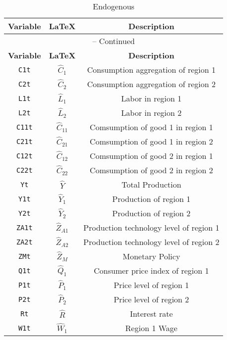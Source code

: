 \begin{center}
\begin{longtable}{ccc}
\caption{Endogenous}\\%
\hline%
\multicolumn{1}{c}{\textbf{Variable}} &
\multicolumn{1}{c}{\textbf{\LaTeX}} &
\multicolumn{1}{c}{\textbf{Description}}\\%
\hline\hline%
\endfirsthead
\multicolumn{3}{c}{{\tablename} \thetable{} -- Continued}\\%
\hline%
\multicolumn{1}{c}{\textbf{Variable}} &
\multicolumn{1}{c}{\textbf{\LaTeX}} &
\multicolumn{1}{c}{\textbf{Description}}\\%
\hline\hline%
\endhead
\texttt{C1t} & ${\hat{C}_{1}}$ & Consumption aggregation of region 1\\
\texttt{C2t} & ${\hat{C}_{2}}$ & Consumption aggregation of region 2\\
\texttt{L1t} & ${\hat{L}_{1}}$ & Labor in region 1\\
\texttt{L2t} & ${\hat{L}_{2}}$ & Labor in region 2\\
\texttt{C11t} & ${\hat{C}_{11}}$ & Comsumption of good 1 in region 1\\
\texttt{C21t} & ${\hat{C}_{21}}$ & Comsumption of good 1 in region 2\\
\texttt{C12t} & ${\hat{C}_{12}}$ & Comsumption of good 2 in region 1\\
\texttt{C22t} & ${\hat{C}_{22}}$ & Comsumption of good 2 in region 2\\
\texttt{Yt} & ${\hat{Y}}$ & Total Production\\
\texttt{Y1t} & ${\hat{Y}_{1}}$ & Production of region 1\\
\texttt{Y2t} & ${\hat{Y}_{2}}$ & Production of region 2\\
\texttt{ZA1t} & ${\hat{Z}_{A1}}$ & Production technology level of region 1\\
\texttt{ZA2t} & ${\hat{Z}_{A2}}$ & Production technology level of region 2\\
\texttt{ZMt} & ${\hat{Z}_M}$ & Monetary Policy\\
\texttt{Q1t} & ${\hat{Q}_{1}}$ & Consumer price index of region 1\\
\texttt{P1t} & ${\hat{P}_{1}}$ & Price level of region 1\\
\texttt{P2t} & ${\hat{P}_{2}}$ & Price level of region 2\\
\texttt{Rt} & ${\hat{R}}$ & Interest rate\\
\texttt{W1t} & ${\hat{W}_{1}}$ & Region 1 Wage\\

\end{longtable}
\end{center}
